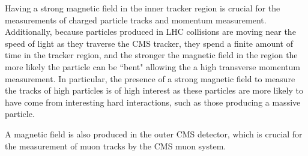 Having a strong magnetic field in the inner tracker region is crucial for the measurements of charged particle tracks and momentum measurement. Additionally, because particles produced in LHC collisions are moving near the speed of light as they traverse the CMS tracker, they spend a finite amount of time in the tracker region, and the stronger the magnetic field in the region the more likely the particle can be ``bent" allowing the a high transverse momentum measurement. In particular, the presence of a strong magnetic field to measure the tracks of high \pt particles is of high interest as these particles are more likely to have come from interesting hard interactions, such as those producing a massive particle. 

A magnetic field is also produced in the outer CMS detector, which is crucial for the measurement of muon tracks by the CMS muon system.